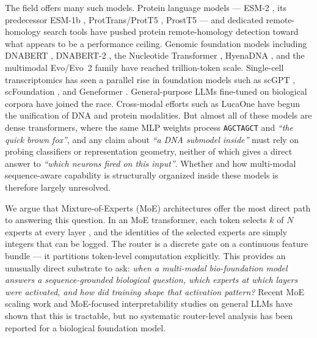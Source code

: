 \documentclass[11pt]{article}
\begin{document}
The field offers many such models. Protein language models --- ESM-2 \citep{lin2023evolutionary}, its predecessor ESM-1b \citep{rives2021biological}, ProtTrans/ProtT5 \citep{elnaggar2021prottrans}, ProstT5 \citep{heinzinger2024prostt5} --- and dedicated remote-homology search tools \citep{hamamsy2024protein, liu2024plmsearch, schutze2023prottranssearch} have pushed protein remote-homology detection toward what appears to be a performance ceiling. Genomic foundation models including DNABERT \citep{ji2021dnabert}, DNABERT-2 \citep{zhou2023dnabert2}, the Nucleotide Transformer \citep{dallatorre2023nucleotide}, HyenaDNA \citep{nguyen2023hyenadna}, and the multimodal Evo/Evo~2 family \citep{nguyen2024evo, brixi2026evo2} have reached trillion-token scale. Single-cell transcriptomics has seen a parallel rise in foundation models such as scGPT \citep{cui2024scgpt}, scFoundation \citep{hao2024scfoundation}, and Geneformer \citep{theodoris2023geneformer}. General-purpose LLMs fine-tuned on biological corpora \citep{wang2026biopaws, luo2022biogpt, bolton2024biomedlm, gu2021pubmedbert} have joined the race. Cross-modal efforts such as LucaOne \citep{he2024lucaone} have begun the unification of DNA and protein modalities. But almost all of these models are dense transformers, where the same MLP weights process \texttt{AGCTAGCT} and \emph{``the quick brown fox''}, and any claim about \emph{``a DNA submodel inside''} must rely on probing classifiers or representation geometry, neither of which gives a direct answer to \emph{``which neurons fired on this input''}. Whether and how multi-modal sequence-aware capability is structurally organized inside these models is therefore largely unresolved.

We argue that Mixture-of-Experts (MoE) architectures offer the most direct path to answering this question. In an MoE transformer, each token selects $k$ of $N$ experts at every layer \citep{shazeer2017sparse, fedus2022switch, zoph2022designing, jiang2024mixtral, vaswani2017attention}, and the identities of the selected experts are simply integers that can be logged. The router is a discrete gate on a continuous feature bundle --- it partitions token-level computation explicitly. This provides an unusually direct substrate to ask: \emph{when a multi-modal bio-foundation model answers a sequence-grounded biological question, which experts at which layers were activated, and how did training shape that activation pattern?} Recent MoE scaling work \citep{dai2024deepseekmoe, liu2024deepseekv2, wang2024loadbalance} and MoE-focused interpretability studies on general LLMs \citep{park2024moeinterpret, kanai2025moeinterp} have shown that this is tractable, but no systematic router-level analysis has been reported for a biological foundation model.
\end{document}
